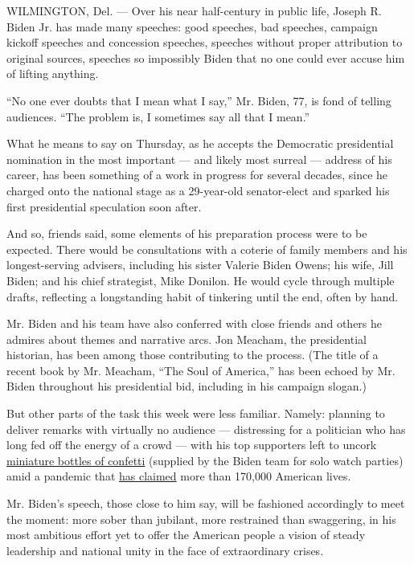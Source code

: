 WILMINGTON, Del. --- Over his near half-century in public life, Joseph
R. Biden Jr. has made many speeches: good speeches, bad speeches,
campaign kickoff speeches and concession speeches, speeches without
proper attribution to original sources, speeches so impossibly Biden
that no one could ever accuse him of lifting anything.

``No one ever doubts that I mean what I say,'' Mr. Biden, 77, is fond of
telling audiences. ``The problem is, I sometimes say all that I mean.''

What he means to say on Thursday, as he accepts the Democratic
presidential nomination in the most important --- and likely most
surreal --- address of his career, has been something of a work in
progress for several decades, since he charged onto the national stage
as a 29-year-old senator-elect and sparked his first presidential
speculation soon after.

And so, friends said, some elements of his preparation process were to
be expected. There would be consultations with a coterie of family
members and his longest-serving advisers, including his sister Valerie
Biden Owens; his wife, Jill Biden; and his chief strategist, Mike
Donilon. He would cycle through multiple drafts, reflecting a
longstanding habit of tinkering until the end, often by hand.

Mr. Biden and his team have also conferred with close friends and others
he admires about themes and narrative arcs. Jon Meacham, the
presidential historian, has been among those contributing to the
process. (The title of a recent book by Mr. Meacham, ``The Soul of
America,'' has been echoed by Mr. Biden throughout his presidential bid,
including in his campaign slogan.)

But other parts of the task this week were less familiar. Namely:
planning to deliver remarks with virtually no audience --- distressing
for a politician who has long fed off the energy of a crowd --- with his
top supporters left to uncork
\href{https://www.nytimes3xbfgragh.onion/2020/08/18/us/politics/virtual-dnc-donors.html}{miniature
bottles of confetti} (supplied by the Biden team for solo watch parties)
amid a pandemic that
\href{https://www.nytimes3xbfgragh.onion/interactive/2020/us/coronavirus-us-cases.html}{has
claimed} more than 170,000 American lives.

Mr. Biden's speech, those close to him say, will be fashioned
accordingly to meet the moment: more sober than jubilant, more
restrained than swaggering, in his most ambitious effort yet to offer
the American people a vision of steady leadership and national unity in
the face of extraordinary crises.

